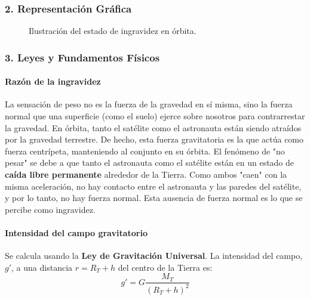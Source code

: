 \subsubsection*{2. Representación Gráfica}
\begin{figure}[H]
    \centering
    \caption{Ilustración del estado de ingravidez en órbita.}
\end{figure}

\subsubsection*{3. Leyes y Fundamentos Físicos}
\paragraph*{Razón de la ingravidez}
La sensación de peso no es la fuerza de la gravedad en sí misma, sino la fuerza normal que una superficie (como el suelo) ejerce sobre nosotros para contrarrestar la gravedad. En órbita, tanto el satélite como el astronauta están siendo atraídos por la gravedad terrestre. De hecho, esta fuerza gravitatoria es la que actúa como fuerza centrípeta, manteniendo al conjunto en su órbita.
El fenómeno de "no pesar" se debe a que tanto el astronauta como el satélite están en un estado de \textbf{caída libre permanente} alrededor de la Tierra. Como ambos "caen" con la misma aceleración, no hay contacto entre el astronauta y las paredes del satélite, y por lo tanto, no hay fuerza normal. Esta ausencia de fuerza normal es lo que se percibe como ingravidez.

\paragraph*{Intensidad del campo gravitatorio}
Se calcula usando la \textbf{Ley de Gravitación Universal}. La intensidad del campo, $g'$, a una distancia $r = R_T + h$ del centro de la Tierra es:
$$g' = G \frac{M_T}{(R_T+h)^2}$$

